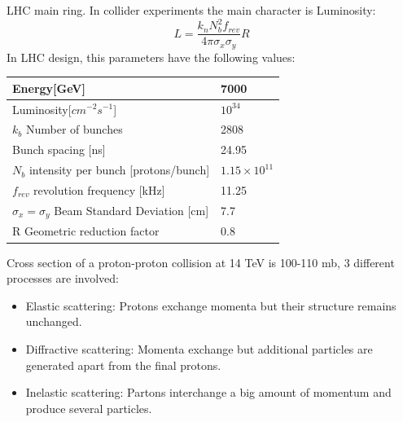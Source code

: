 \documentclass[8pt]{beamer}
\begin{document}
\begin{frame}[fragile]{LHC main ring.}
	In collider experiments the main character is Luminosity:
\begin{equation}
\nonumber L=\frac{k_nN_{b}^{2}f_{rev}}{4\pi\sigma_x \sigma_y}R
\end{equation}
In LHC design, this parameters have the following values:	
	\begin{table}[]
		\centering
		\label{my-label}
		\begin{tabular}{|l|l|}
			
			\hline
			Energy{[}GeV{]}                                                   &        7000            \\ \hline
			Luminosity{[}$cm^{-2}s^{-1}${]} &      $10^{34}    $           \\ \hline
			$k_b$ Number of bunches                                            &            2808        \\ \hline
			Bunch spacing {[}ns{]}                                            &          24.95          \\ \hline
			$N_b$ intensity per bunch {[}protons/bunch{]}                      &            $1.15\times 10^{11}$        \\ \hline
			$f_{rev}$ revolution frequency {[}kHz{]}                         &           11.25         \\ \hline
			$\sigma_x=\sigma_y$  Beam Standard Deviation  [cm]                    &           7.7         \\ \hline R Geometric reduction factor
			&           0.8         \\ \hline
			
		\end{tabular}
	\end{table}
	Cross section of a proton-proton collision at 14 TeV is 100-110 mb, 3 different processes are involved:
	\begin{itemize}
		\item Elastic scattering: Protons exchange momenta but their structure remains unchanged.
		\item Diffractive scattering: Momenta exchange but additional particles are generated apart from the final protons.
		\item Inelastic scattering: Partons interchange a big amount of momentum and produce several particles.
		
	\end{itemize} 
\end{frame}
\end{document}
